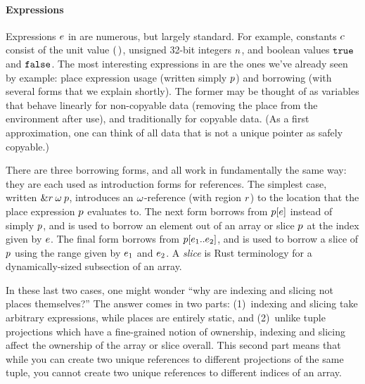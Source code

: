 \paragraph{Expressions} Expressions $e$ in \lang are numerous, but largely
standard. For example, constants $c$ consist of the unit value $\mathtt{(\,)}$,
unsigned 32-bit integers $n$, and boolean values $\mathtt{true}$ and $\mathtt{false}$.
The most interesting expressions in \lang are the ones we've already seen by
example: place expression usage (written simply $p$) and borrowing
(with several forms that we explain shortly). The former may be thought of as
variables that behave linearly for non-copyable data (removing the place from
the environment after use), and traditionally for copyable data. (As a first
approximation, one can think of all data that is not a unique pointer as safely
copyable.)

There are three borrowing forms, and all work in fundamentally the same way:
they are each used as introduction forms for references. The simplest case,
written $\&r \: \omega \: p$, introduces an
$\omega$-reference (with region $r$) to the location that the place
expression $p$ evaluates to. The next form borrows from
$p [ e ]$ instead of simply $p$, and is used
to borrow an element out of an array or slice $p$ at the index given
by $e$. The final form borrows from
$p [ e_1 .. e_2 ]$, and is used to borrow a slice of
$p$ using the range given by $e_1$ and $e_2$. A
\emph{slice} is Rust terminology for a dynamically-sized subsection of an array.

In these last two cases, one might wonder ``why are indexing and slicing not
places themselves?'' The answer comes in two parts: (1)~indexing and slicing
take arbitrary expressions, while places are entirely static, and (2)~unlike
tuple projections which have a fine-grained notion of ownership, indexing and
slicing affect the ownership of the array or slice overall. This second part
means that while you can create two unique references to different projections
of the same tuple, you cannot create two unique references to different indices
of an array.

